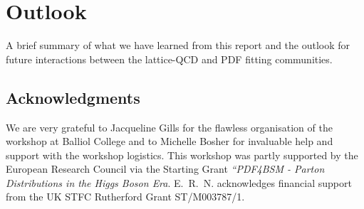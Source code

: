 \section{Outlook}
\label{sec:outlook}

A brief summary of what we have learned from this report
and the outlook for future interactions between the lattice-QCD and PDF fitting communities.


\subsection*{Acknowledgments}

We are very grateful to Jacqueline Gills for the flawless organisation
of the workshop at Balliol College and to Michelle Bosher for
invaluable help and support with the workshop logistics.
%
This workshop was partly supported by the European Research Council via
the Starting Grant {\it ``PDF4BSM - Parton Distributions in the
  Higgs Boson Era}.
%
E.~R.~N. acknowledges financial support from the
UK STFC Rutherford Grant ST/M003787/1.
